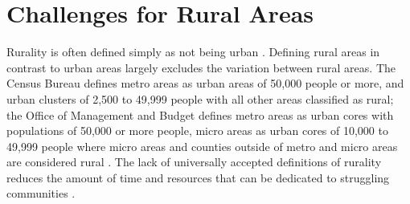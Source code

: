 \section{Challenges for Rural Areas}

 Rurality is often defined simply as not being urban \citep{robertson_rural_2007}. Defining rural areas in contrast to urban areas largely excludes the variation between rural areas. The Census Bureau defines metro areas as urban areas of 50,000 people or more, and urban clusters of 2,500 to 49,999 people with all other areas classified as rural; the Office of Management and Budget defines metro areas as urban cores with populations of 50,000 or more people, micro areas as urban cores of 10,000 to 49,999 people where micro areas and counties outside of metro and micro areas are considered rural \citep{health_resources__services_administration_defining_2022}. %
 The lack of universally accepted definitions of rurality reduces the amount of time and resources that can be dedicated to struggling communities \citep{yousey_defining_2018}. 
 

